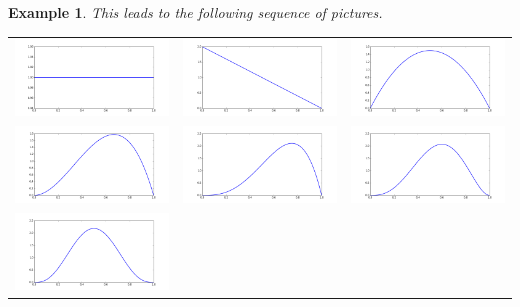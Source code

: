 \documentclass[leqno]{tufte-book} %
\newtheorem{example}[theorem]{Example}
\begin{document}
\begin{example}
\noindent This leads to the following sequence of pictures.
\begin{center}
\begin{tabular}{ccc}
\includegraphics[width=15em]{Pictures/cont_coin_parameter-0.png} 
&
\includegraphics[width=15em]{Pictures/cont_coin_parameter-1.png}
&
\includegraphics[width=15em]{Pictures/cont_coin_parameter-2.png}
\\
\includegraphics[width=15em]{Pictures/cont_coin_parameter-3.png} 
&
\includegraphics[width=15em]{Pictures/cont_coin_parameter-4.png}
&
\includegraphics[width=15em]{Pictures/cont_coin_parameter-5.png}
\\
\includegraphics[width=15em]{Pictures/cont_coin_parameter-6.png} 

\end{tabular}
\end{center}
\end{example}
\end{document}
